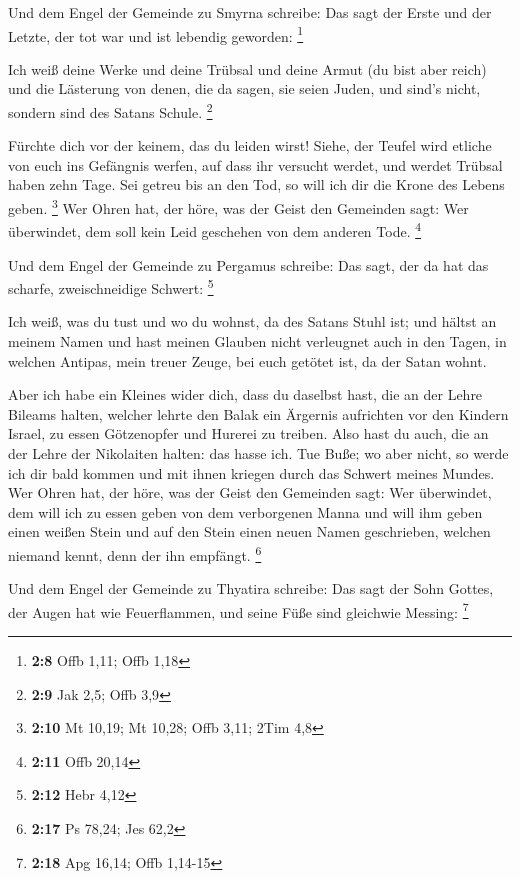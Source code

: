  Und dem Engel der Gemeinde zu Smyrna schreibe: Das sagt
der Erste und der Letzte, der tot war und ist lebendig geworden:
\footnote{\textbf{2:8} Offb 1,11; Offb 1,18}

 Ich weiß deine Werke und deine Trübsal und deine Armut
(du bist aber reich) und die Lästerung von denen, die da sagen, sie
seien Juden, und sind's nicht, sondern sind des Satans Schule.
\footnote{\textbf{2:9} Jak 2,5; Offb 3,9}

 Fürchte dich vor der keinem, das du leiden wirst! Siehe,
der Teufel wird etliche von euch ins Gefängnis werfen, auf dass ihr
versucht werdet, und werdet Trübsal haben zehn Tage. Sei getreu bis an
den Tod, so will ich dir die Krone des Lebens geben. \footnote{\textbf{2:10}
  Mt 10,19; Mt 10,28; Offb 3,11; 2Tim 4,8}  Wer Ohren
hat, der höre, was der Geist den Gemeinden sagt: Wer überwindet, dem
soll kein Leid geschehen von dem anderen Tode. \footnote{\textbf{2:11}
  Offb 20,14}

 Und dem Engel der Gemeinde zu Pergamus schreibe: Das
sagt, der da hat das scharfe, zweischneidige Schwert: \footnote{\textbf{2:12}
  Hebr 4,12}

 Ich weiß, was du tust und wo du wohnst, da des Satans
Stuhl ist; und hältst an meinem Namen und hast meinen Glauben nicht
verleugnet auch in den Tagen, in welchen Antipas, mein treuer Zeuge, bei
euch getötet ist, da der Satan wohnt.

 Aber ich habe ein Kleines wider dich, dass du daselbst
hast, die an der Lehre Bileams halten, welcher lehrte den Balak ein
Ärgernis aufrichten vor den Kindern Israel, zu essen Götzenopfer und
Hurerei zu treiben.  Also hast du auch, die an der Lehre
der Nikolaiten halten: das hasse ich.  Tue Buße; wo aber
nicht, so werde ich dir bald kommen und mit ihnen kriegen durch das
Schwert meines Mundes.  Wer Ohren hat, der höre, was der
Geist den Gemeinden sagt: Wer überwindet, dem will ich zu essen geben
von dem verborgenen Manna und will ihm geben einen weißen Stein und auf
den Stein einen neuen Namen geschrieben, welchen niemand kennt, denn der
ihn empfängt. \footnote{\textbf{2:17} Ps 78,24; Jes 62,2}

 Und dem Engel der Gemeinde zu Thyatira schreibe: Das
sagt der Sohn Gottes, der Augen hat wie Feuerflammen, und seine Füße
sind gleichwie Messing: \footnote{\textbf{2:18} Apg 16,14; Offb 1,14-15}

